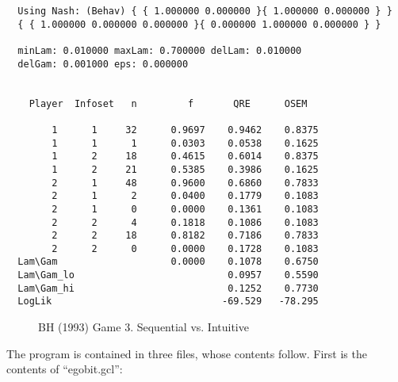 \begin{verbatim}
  Using Nash: (Behav) { { 1.000000 0.000000 }{ 1.000000 0.000000 } }
  { { 1.000000 0.000000 0.000000 }{ 0.000000 1.000000 0.000000 } }

  minLam: 0.010000 maxLam: 0.700000 delLam: 0.010000
  delGam: 0.001000 eps: 0.000000


    Player  Infoset   n         f       QRE      OSEM

        1      1     32      0.9697    0.9462    0.8375
        1      1      1      0.0303    0.0538    0.1625
        1      2     18      0.4615    0.6014    0.8375
        1      2     21      0.5385    0.3986    0.1625
        2      1     48      0.9600    0.6860    0.7833
        2      1      2      0.0400    0.1779    0.1083
        2      1      0      0.0000    0.1361    0.1083
        2      2      4      0.1818    0.1086    0.1083
        2      2     18      0.8182    0.7186    0.7833
        2      2      0      0.0000    0.1728    0.1083
  Lam\Gam                    0.0000    0.1078    0.6750
  Lam\Gam_lo                           0.0957    0.5590
  Lam\Gam_hi                           0.1252    0.7730
  LogLik                              -69.529   -78.295
\end{verbatim}


\newpage
\begin{figure}[htp]
\centerline{}
\vspace{.5in}
\centerline{}
\caption{BH (1993) Game 3. Sequential vs. Intuitive}
\end{figure}

\newpage
\noindent
The program is contained in three files, whose contents follow.  First
is the contents of ``egobit.gcl'':

